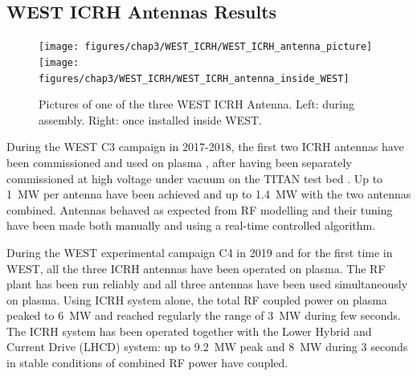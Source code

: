 {\clearpage

\subsection{WEST ICRH Antennas Results}

\begin{figure}
	\centering
	\texttt{[image: figures/chap3/WEST\_ICRH/WEST\_ICRH\_antenna\_picture]}	\texttt{[image: figures/chap3/WEST\_ICRH/WEST\_ICRH\_antenna\_inside\_WEST]}
	\caption{Pictures of one of the three WEST ICRH Antenna. Left: during assembly. Right: once installed inside WEST.}
	\label{fig:westicrhantennapicture}
\end{figure}

During the WEST C3 campaign in 2017-2018, the first two ICRH antennas have been commissioned and used on plasma , after having been separately commissioned at high voltage under vacuum on the TITAN test bed . Up to 1~MW per antenna have been achieved and up to 1.4~MW with the two antennas combined. Antennas behaved as expected from RF modelling and their tuning have been made both manually and using a real-time controlled algorithm. 

During the WEST experimental campaign C4 in 2019 and for the first time in WEST, all the three ICRH antennas have been operated on plasma. The RF plant has been run reliably and all three antennas have been used simultaneously on plasma. Using ICRH system alone, the total RF coupled power on plasma peaked to 6~MW and reached regularly the range of 3~MW during few seconds. The ICRH system has been operated together with the Lower Hybrid and Current Drive (LHCD) system: up to 9.2~MW peak and 8~MW during 3 seconds in stable conditions of combined RF power have coupled.

}
